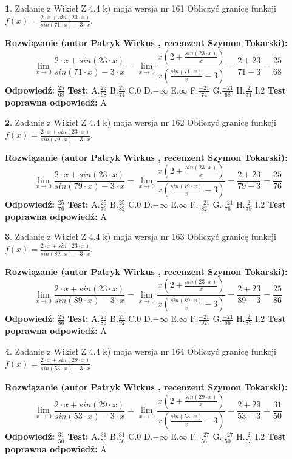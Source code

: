 \documentclass[12pt, a4paper]{article}
\theoremstyle{definition} %
\newtheorem{zad}{}
\newcommand{\zadStart}[1]{\begin{zad}#1\newline}
\newcommand{\zadStop}{\end{zad}}
\newcommand{\rozwStart}[2]{\noindent \textbf{Rozwiązanie (autor #1 , recenzent #2): }\newline}
\newcommand{\rozwStop}{\newline}
\newcommand{\odpStart}{\noindent \textbf{Odpowiedź:}\newline}
\newcommand{\odpStop}{\newline}
\newcommand{\testStart}{\noindent \textbf{Test:}\newline}
\newcommand{\testStop}{\newline}
\newcommand{\kluczStart}{\noindent \textbf{Test poprawna odpowiedź:}\newline}
\newcommand{\kluczStop}{\newline}
\begin{document}
\zadStart{Zadanie z Wikieł Z 4.4 k) moja wersja nr 161}
Obliczyć granicę funkcji $f(x)=\frac{2\cdot x +sin(23\cdot x)}{sin(71\cdot x) -3\cdot x}$.
\zadStop
\rozwStart{Patryk Wirkus}{Szymon Tokarski}
$$\lim\limits_{x\to 0}\frac{2\cdot x +sin(23\cdot x)}{sin(71\cdot x) -3\cdot x}
=\lim\limits_{x\to 0}\frac{x(2+\frac{sin(23\cdot x)}{x})}{x(\frac{sin(71\cdot x)}{x}-3)}
=\frac{2+23}{71-3} = \frac{25}{68}$$
\rozwStop
\odpStart
$\frac{25}{68}$
\odpStop
\testStart
A.$\frac{25}{68}$
B.$\frac{25}{74}$
C.$0$
D.$-\infty$
E.$\infty$
F.$\frac{-21}{74}$
G.$\frac{-21}{68}$
H.$\frac{2}{71}$
I.$2$
\testStop
\kluczStart
A
\kluczStop



\zadStart{Zadanie z Wikieł Z 4.4 k) moja wersja nr 162}
Obliczyć granicę funkcji $f(x)=\frac{2\cdot x +sin(23\cdot x)}{sin(79\cdot x) -3\cdot x}$.
\zadStop
\rozwStart{Patryk Wirkus}{Szymon Tokarski}
$$\lim\limits_{x\to 0}\frac{2\cdot x +sin(23\cdot x)}{sin(79\cdot x) -3\cdot x}
=\lim\limits_{x\to 0}\frac{x(2+\frac{sin(23\cdot x)}{x})}{x(\frac{sin(79\cdot x)}{x}-3)}
=\frac{2+23}{79-3} = \frac{25}{76}$$
\rozwStop
\odpStart
$\frac{25}{76}$
\odpStop
\testStart
A.$\frac{25}{76}$
B.$\frac{25}{82}$
C.$0$
D.$-\infty$
E.$\infty$
F.$\frac{-21}{82}$
G.$\frac{-21}{76}$
H.$\frac{2}{79}$
I.$2$
\testStop
\kluczStart
A
\kluczStop



\zadStart{Zadanie z Wikieł Z 4.4 k) moja wersja nr 163}
Obliczyć granicę funkcji $f(x)=\frac{2\cdot x +sin(23\cdot x)}{sin(89\cdot x) -3\cdot x}$.
\zadStop
\rozwStart{Patryk Wirkus}{Szymon Tokarski}
$$\lim\limits_{x\to 0}\frac{2\cdot x +sin(23\cdot x)}{sin(89\cdot x) -3\cdot x}
=\lim\limits_{x\to 0}\frac{x(2+\frac{sin(23\cdot x)}{x})}{x(\frac{sin(89\cdot x)}{x}-3)}
=\frac{2+23}{89-3} = \frac{25}{86}$$
\rozwStop
\odpStart
$\frac{25}{86}$
\odpStop
\testStart
A.$\frac{25}{86}$
B.$\frac{25}{92}$
C.$0$
D.$-\infty$
E.$\infty$
F.$\frac{-21}{92}$
G.$\frac{-21}{86}$
H.$\frac{2}{89}$
I.$2$
\testStop
\kluczStart
A
\kluczStop



\zadStart{Zadanie z Wikieł Z 4.4 k) moja wersja nr 164}
Obliczyć granicę funkcji $f(x)=\frac{2\cdot x +sin(29\cdot x)}{sin(53\cdot x) -3\cdot x}$.
\zadStop
\rozwStart{Patryk Wirkus}{Szymon Tokarski}
$$\lim\limits_{x\to 0}\frac{2\cdot x +sin(29\cdot x)}{sin(53\cdot x) -3\cdot x}
=\lim\limits_{x\to 0}\frac{x(2+\frac{sin(29\cdot x)}{x})}{x(\frac{sin(53\cdot x)}{x}-3)}
=\frac{2+29}{53-3} = \frac{31}{50}$$
\rozwStop
\odpStart
$\frac{31}{50}$
\odpStop
\testStart
A.$\frac{31}{50}$
B.$\frac{31}{56}$
C.$0$
D.$-\infty$
E.$\infty$
F.$\frac{-27}{56}$
G.$\frac{-27}{50}$
H.$\frac{2}{53}$
I.$2$
\testStop
\kluczStart
A
\kluczStop
\end{document}
